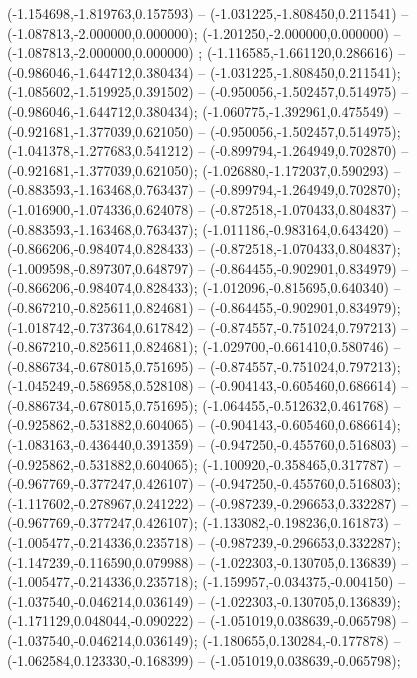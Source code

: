  (-1.154698,-1.819763,0.157593) -- (-1.031225,-1.808450,0.211541) -- (-1.087813,-2.000000,0.000000);
 (-1.201250,-2.000000,0.000000) -- (-1.087813,-2.000000,0.000000) ;
 (-1.116585,-1.661120,0.286616) -- (-0.986046,-1.644712,0.380434) -- (-1.031225,-1.808450,0.211541);
 (-1.085602,-1.519925,0.391502) -- (-0.950056,-1.502457,0.514975) -- (-0.986046,-1.644712,0.380434);
 (-1.060775,-1.392961,0.475549) -- (-0.921681,-1.377039,0.621050) -- (-0.950056,-1.502457,0.514975);
 (-1.041378,-1.277683,0.541212) -- (-0.899794,-1.264949,0.702870) -- (-0.921681,-1.377039,0.621050);
 (-1.026880,-1.172037,0.590293) -- (-0.883593,-1.163468,0.763437) -- (-0.899794,-1.264949,0.702870);
 (-1.016900,-1.074336,0.624078) -- (-0.872518,-1.070433,0.804837) -- (-0.883593,-1.163468,0.763437);
 (-1.011186,-0.983164,0.643420) -- (-0.866206,-0.984074,0.828433) -- (-0.872518,-1.070433,0.804837);
 (-1.009598,-0.897307,0.648797) -- (-0.864455,-0.902901,0.834979) -- (-0.866206,-0.984074,0.828433);
 (-1.012096,-0.815695,0.640340) -- (-0.867210,-0.825611,0.824681) -- (-0.864455,-0.902901,0.834979);
 (-1.018742,-0.737364,0.617842) -- (-0.874557,-0.751024,0.797213) -- (-0.867210,-0.825611,0.824681);
 (-1.029700,-0.661410,0.580746) -- (-0.886734,-0.678015,0.751695) -- (-0.874557,-0.751024,0.797213);
 (-1.045249,-0.586958,0.528108) -- (-0.904143,-0.605460,0.686614) -- (-0.886734,-0.678015,0.751695);
 (-1.064455,-0.512632,0.461768) -- (-0.925862,-0.531882,0.604065) -- (-0.904143,-0.605460,0.686614);
 (-1.083163,-0.436440,0.391359) -- (-0.947250,-0.455760,0.516803) -- (-0.925862,-0.531882,0.604065);
 (-1.100920,-0.358465,0.317787) -- (-0.967769,-0.377247,0.426107) -- (-0.947250,-0.455760,0.516803);
 (-1.117602,-0.278967,0.241222) -- (-0.987239,-0.296653,0.332287) -- (-0.967769,-0.377247,0.426107);
 (-1.133082,-0.198236,0.161873) -- (-1.005477,-0.214336,0.235718) -- (-0.987239,-0.296653,0.332287);
 (-1.147239,-0.116590,0.079988) -- (-1.022303,-0.130705,0.136839) -- (-1.005477,-0.214336,0.235718);
 (-1.159957,-0.034375,-0.004150) -- (-1.037540,-0.046214,0.036149) -- (-1.022303,-0.130705,0.136839);
 (-1.171129,0.048044,-0.090222) -- (-1.051019,0.038639,-0.065798) -- (-1.037540,-0.046214,0.036149);
 (-1.180655,0.130284,-0.177878) -- (-1.062584,0.123330,-0.168399) -- (-1.051019,0.038639,-0.065798);
